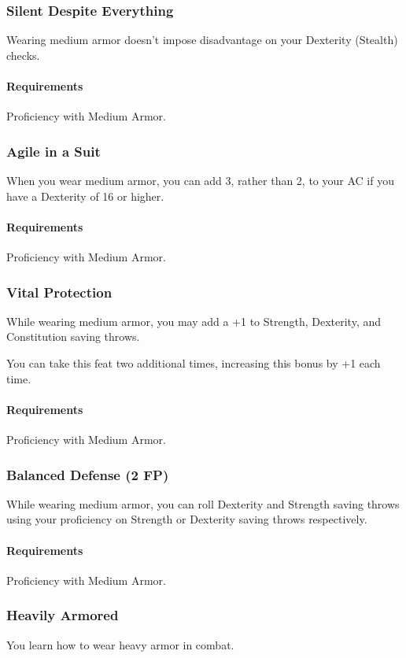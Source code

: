 \subsubsection{Silent Despite Everything} \label{feat::silentdespiteeverything}
    Wearing medium armor doesn't impose disadvantage on your Dexterity (Stealth) checks.
    \paragraph{Requirements} Proficiency with Medium Armor.
\subsubsection{Agile in a Suit} \label{feat::agileinasuit}
    When you wear medium armor, you can add 3, rather than 2, to your AC if you have a Dexterity of 16 or higher.
    \paragraph{Requirements} Proficiency with Medium Armor.
\subsubsection{Vital Protection} \label{feat::vitalprotection}
    While wearing medium armor, you may add a +1 to Strength, Dexterity, and Constitution saving throws.

    You can take this feat two additional times, increasing this bonus by +1 each time.
    \paragraph{Requirements} Proficiency with Medium Armor.
\subsubsection{Balanced Defense (2 FP)} \label{feat::balanceddefense}
    While wearing medium armor, you can roll Dexterity and Strength saving throws using your proficiency on Strength or Dexterity saving throws respectively.
    \paragraph{Requirements} Proficiency with Medium Armor.
\subsubsection{Heavily Armored} \label{feat::heavilyarmored}
    You learn how to wear heavy armor in combat.
